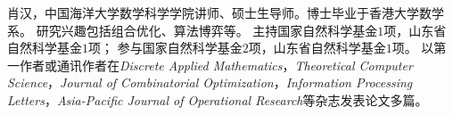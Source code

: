 %
%

\par{
\fontsize{9.65pt}{\baselineskip}\selectfont
肖汉，中国海洋大学数学科学学院讲师、硕士生导师。博士毕业于香港大学数学系。
研究兴趣包括组合优化、算法博弈等。
主持国家自然科学基金$1$项，山东省自然科学基金$1$项；
参与国家自然科学基金$2$项，山东省自然科学基金$1$项。
以第一作者或通讯作者在\emph{Discrete Applied Mathematics}，\emph{Theoretical Computer Science}，\emph{Journal of Combinatorial Optimization}，\emph{Information Processing Letters}，\emph{Asia-Pacific Journal of Operational Research}等杂志发表论文多篇。
}